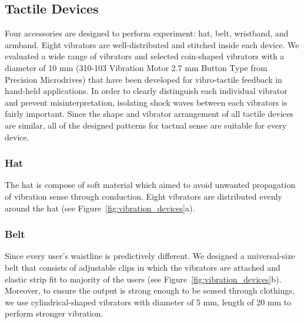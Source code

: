 \documentclass{sigchi}
\begin{document}
\subsection{Tactile Devices}
Four accessories are designed to perform experiment: hat, belt, wristband, and armband. Eight vibrators are well-distributed and stitched inside each device. We evaluated a wide range of vibrators and selected coin-shaped vibrators with a diameter of 10 mm (310-103 Vibration Motor 2.7 mm Button Type from Precision Microdrives) that have been developed for vibro-tactile feedback in hand-held applications. In order to clearly distinguish each individual vibrator and prevent misinterpretation, isolating shock waves between each vibrators is fairly important. Since the shape and vibrator arrangement of all tactile devices are similar, all of the designed patterns for tactual sense are suitable for every device. 


%
%

\subsubsection{Hat}
The hat is compose of soft material which aimed to avoid unwanted propagation of vibration sense through conduction. Eight vibrators are distributed evenly around the hat (see Figure~\ref{fig:vibration_devices}a).

\subsubsection{Belt}
Since every user's waistline is predictively different. We designed a universal-size belt that consists of adjustable clips in which the vibrators are attached and elastic strip fit to majority of the users (see Figure~\ref{fig:vibration_devices}b). Moreover, to ensure the output is strong enough to be sensed through clothings, we use cylindrical-shaped vibrators with diameter of 5 mm, length of 20 mm to perform stronger vibration.
\end{document}
